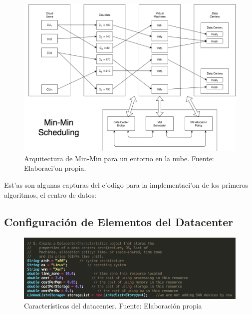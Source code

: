 \begin{figure}
	\caption{Arquitectura de Min-Min para un entorno en la nube. Fuente: Elaboraci'on propia.}
	\centering
	\includegraphics[scale=0.5]{media/imagencinco}
\end{figure}

\newpage

Est'as son algunas capturas del c'odigo para la implementaci'on de los primeros algoritmos, el centro de datos:

\subsection*{Configuración de Elementos del Datacenter}

\begin{figure}[h]
	\caption{Características del datacenter. Fuente: Elaboración propia}
	\centering
	\includegraphics[scale=0.5]{media/caracteristicas_datacenter}
\end{figure}

